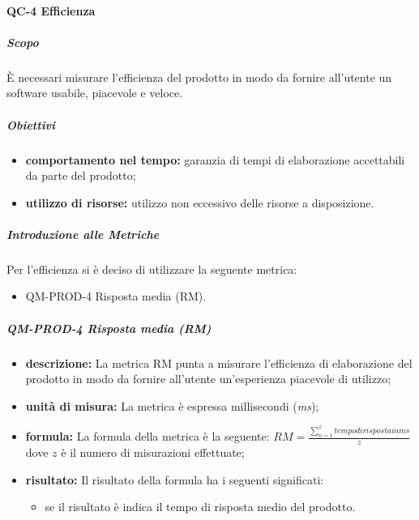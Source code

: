 		\paragraph{QC-4 Efficienza}
			\subparagraph{Scopo}
				È necessari misurare l'efficienza del prodotto in modo da fornire all'utente un software usabile, piacevole e veloce.
				\subparagraph{Obiettivi}
					\begin{itemize}
						\item \textbf{comportamento nel tempo:} garanzia di tempi di elaborazione accettabili da parte del prodotto;
						\item \textbf{utilizzo di risorse:} utilizzo non eccessivo delle risorse a disposizione.
					\end{itemize}
			\subparagraph{Introduzione alle Metriche}
				Per l'efficienza si è deciso di utilizzare la seguente metrica:
				\begin{itemize}
					\item QM-PROD-4 Risposta media (RM).
				\end{itemize}
			\subparagraph{QM-PROD-4 Risposta media (RM)}
			\begin{itemize}
      			\item \textbf{descrizione: }
					La metrica RM punta a misurare l'efficienza di elaborazione del prodotto in modo da fornire all'utente un'esperienza piacevole di utilizzo;
				\item \textbf{unità di misura: }
					La metrica è espressa millisecondi (\textit{ms});
				\item \textbf{formula: }
					La formula della metrica è la seguente:
					\(
						RM = \frac{\sum_{n=1}^{z} tempo di risposta in ms}{z}
					\)
					dove $z$ è il numero di misurazioni effettuate;
				\item \textbf{risultato: }
					Il risultato della formula ha i seguenti significati:
					\begin{itemize}
						\item se il risultato è indica il tempo di risposta medio del prodotto.
					\end{itemize}
			\end{itemize}
